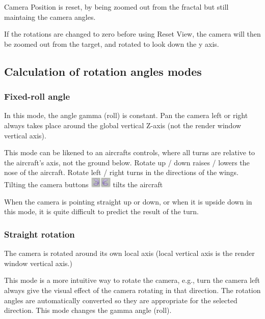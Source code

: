 Camera Position is reset, by being zoomed out from the fractal but still
maintaing the camera angles.

If the rotations are changed to zero before using Reset View, the camera will
then be zoomed out from the target, and rotated to look down the y axis.

\subsection{Calculation of rotation angles
	modes}\label{calculation-of-rotation-angles-modes}

\subsubsection{Fixed-roll angle}\label{fixed-roll-angle}

In this mode, the angle gamma (roll) is constant. Pan the camera left or right
always takes place around the global vertical Z-axis (not the render window
vertical axis).

This mode can be likened to an aircrafts controls, where all turns are relative
to the aircraft's axis, not the ground below. Rotate up / down raises / lowers
the nose of the aircraft. Rotate left / right turns in the directions of the
wings. Tilting the camera buttons
\includegraphics[width=0.20000in,height=0.20000in]{img/manual/media/button_roll_left.png}\includegraphics[width=0.20000in,height=0.20000in]{img/manual/media/button_roll_right.png}
tilts the aircraft

When the camera is pointing straight up or down, or when it is upside down in
this mode, it is quite difficult to predict the result of the turn.

\subsubsection{Straight rotation}\label{straight-rotation}

The camera is rotated around its own local axis (local vertical axis is the
render window vertical axis.)

This mode is a more intuitive way to rotate the camera, e.g., turn the camera
left always give the visual effect of the camera rotating in that direction. The
rotation angles are automatically converted so they are appropriate for the
selected direction. This mode changes the gamma angle (roll).

